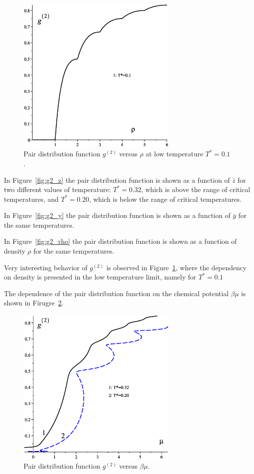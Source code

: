 \begin{figure}[htbp]
	\includegraphics[width=0.7\textwidth,angle=0]{g2_vs_rho_low_temp}
	\caption{Pair distribution function $g^{(2)}$ versus $\rho$ at low temperature $T^*=0.1$.}
	\label{fig:g2_rho_low_temp}
\end{figure}

In Figure~\ref{fig:g2_z} the pair distribution function is shown as a function of $\bar{z}$ for two different values of temperature: $T^*=0.32$, which is above the range of critical temperatures, and $T^*=0.20$, which is below the range of critical temperatures. 

In Figure~\ref{fig:g2_y} the pair distribution function is shown as a function of $\bar{y}$ for the same temperatures.

In Figure~\ref{fig:g2_rho} the pair distribution function is shown as a function of density $\rho$ for the same temperatures.

Very interesting behavior of $g^{(2)}$ is observed in Figure~\ref{fig:g2_rho_low_temp}, where the dependency on density is presented in the low temperature limit, namely for $T^*=0.1$ 

The dependence of the pair distribution function on the chemical potential $\beta\mu$ is shown in Firugre~\ref{fig:g2_mu}.
\begin{figure}[htbp]
	\includegraphics[width=0.7\textwidth,angle=0]{g2_vs_mu}
	\caption{Pair distribution function $g^{(2)}$ versus $\beta\mu$.}
	\label{fig:g2_mu}
\end{figure}


